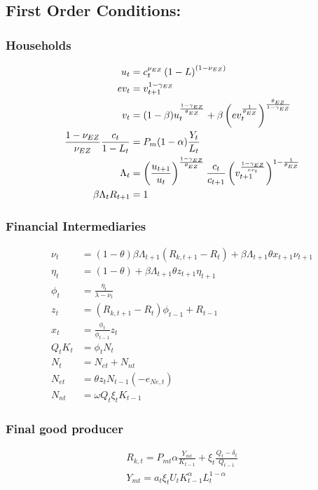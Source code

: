 \documentclass[document.tex]{subfiles}
\begin{document}
\subsection*{First Order Conditions:}
\subsubsection*{Households}
\begin{align*}
u_t &= c_t^{\nu_{EZ}} \left( 1- L\right) ^{(1-\nu_{EZ})} \\ 
ev_t &= v_{t+1}^{1-\gamma_{EZ}} \\  
v_t &= (1-\beta) u_t^{\frac{1-\gamma_{EZ}}{\theta_{EZ}}} 
+ \beta \left( ev_t^{\frac{1}{\theta_{EZ}}} \right) ^{\frac{\theta_{EZ}}{1-\gamma_{EZ}}} \\
\frac{1-\nu_{EZ}}{\nu_{EZ}} \frac{c_t}{1-L_t} &= P_m (1-\alpha) \frac{Y_t}{L_t} \\
\Lambda_t &= \left( \frac{u_{t+1}}{u_t} \right) ^{\frac{1-\gamma_{EZ}}{\theta_{EZ}}}
\frac{c_t}{c_{t+1}} \left( v_{t+1}^{\frac{1-\gamma_{EZ}}{ev_t}}\right) ^{1-\frac{1}{\theta_{EZ}}}\\
\beta \Lambda_t  R_{t+1}&= 1
\end{align*}

\subsubsection*{Financial Intermediaries}
\begin{align*}
\nu_t     &=   (1-\theta) \beta \Lambda_{t+1} (R_{k,t+1} - R_t) + \beta \Lambda_{t+1} \theta x_{t+1} \nu_{t+1} \\
\eta_t    &=   (1-\theta)+\beta \Lambda_{t+1} \theta z_{t+1} \eta_{t+1} \\
\phi_t &= \frac{\eta_t}{\lambda - \nu_t} \\
z_t &= (R_{k,t+1} - R_t) \phi_{t-1} + R_{t-1} \\
x_t &= \frac{\phi_t}{\phi_{t-1}} z_t \\
Q_t K_t &= \phi_t N_t \\
N_t &= N_{et} + N_{nt} \\
N_{et} &= \theta z_t N_{t-1} (-e_{Ne, t})\\
N_{nt} &= \omega Q_t \xi_t K_{t-1} 
\end{align*}

\subsubsection*{Final good producer}
\begin{align*}
R_{k,t} = P_{mt} \alpha \frac{Y_{mt}}{K_{t-1}} + \xi_t \frac{Q_t-\delta_t}{Q_{t-1}} \\
Y_{mt} = a_t \xi_t U_t K_{t-1}^{\alpha} L_t^{1-\alpha} 
\end{align*}
\end{document}
